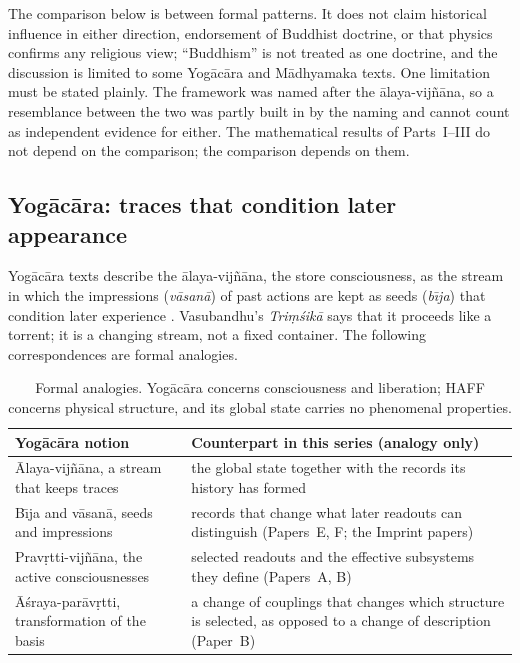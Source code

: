 \documentclass[11pt,a4paper]{article}
\begin{document}
The comparison below is between formal patterns. It does not claim historical influence in either direction, endorsement of Buddhist doctrine, or that physics confirms any religious view; ``Buddhism'' is not treated as one doctrine, and the discussion is limited to some Yog\=ac\=ara and M\=adhyamaka texts. One limitation must be stated plainly. The framework was named after the \=alaya-vij\~n\=ana, so a resemblance between the two was partly built in by the naming and cannot count as independent evidence for either. The mathematical results of Parts~I--III do not depend on the comparison; the comparison depends on them.

\subsection{Yog\=ac\=ara: traces that condition later appearance}

Yog\=ac\=ara texts describe the \=alaya-vij\~n\=ana, the store consciousness, as the stream in which the impressions (\emph{v\=asan\=a}) of past actions are kept as seeds (\emph{b\={\i}ja}) that condition later experience \cite{Asanga_Mahayana,Vasubandhu_Trimsika,Lusthaus2002,Waldron2003}. Vasubandhu's \emph{Tri\d{m}\'sik\=a} says that it proceeds like a torrent; it is a changing stream, not a fixed container. The following correspondences are formal analogies.

\begin{table}[ht]
\centering
\small
\begin{tabular}{P{5.2cm}P{8.3cm}}
\toprule
Yog\=ac\=ara notion & Counterpart in this series (analogy only)\\
\midrule
\=Alaya-vij\~n\=ana, a stream that keeps traces & the global state together with the records its history has formed\\
B\={\i}ja and v\=asan\=a, seeds and impressions & records that change what later readouts can distinguish (Papers~E, F; the Imprint papers)\\
Prav\d{r}tti-vij\~n\=ana, the active consciousnesses & selected readouts and the effective subsystems they define (Papers~A, B)\\
\=A\'sraya-par\=av\d{r}tti, transformation of the basis & a change of couplings that changes which structure is selected, as opposed to a change of description (Paper~B)\\
\bottomrule
\end{tabular}
\caption{Formal analogies. Yog\=ac\=ara concerns consciousness and liberation; HAFF concerns physical structure, and its global state carries no phenomenal properties.}
\label{tab:yogacara}
\end{table}
\end{document}
